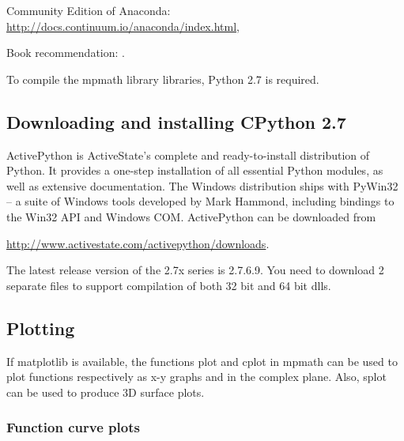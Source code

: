 Community Edition of Anaconda: \href{http://docs.continuum.io/anaconda/index.html}{http://docs.continuum.io/anaconda/index.html}, 

%

\vpara
Book recommendation: \cite{McKinney2012}.



To compile the mpmath library libraries, Python 2.7 is required.

\subsection{Downloading and installing  CPython 2.7}
ActivePython is ActiveState's complete and ready-to-install distribution of Python. It provides a one-step installation of all essential Python modules, as well as extensive documentation. 
The Windows distribution ships with PyWin32 -- a suite of Windows tools developed by Mark Hammond, including bindings to the Win32 API and Windows COM. 
ActivePython can be downloaded from

\vpara
\href{http://www.activestate.com/activepython/downloads}{http://www.activestate.com/activepython/downloads}.

\vpara
The latest release version of the 2.7x series is 2.7.6.9. You need to download 2 separate files to support compilation of both 32 bit and 64 bit dlls.






\newpage
\subsection{Plotting}

If matplotlib is available, the functions plot and cplot in mpmath can be used to plot functions respectively as x-y graphs and in the complex plane. Also, splot can be used to
produce 3D surface plots.

\subsubsection{Function curve plots}

